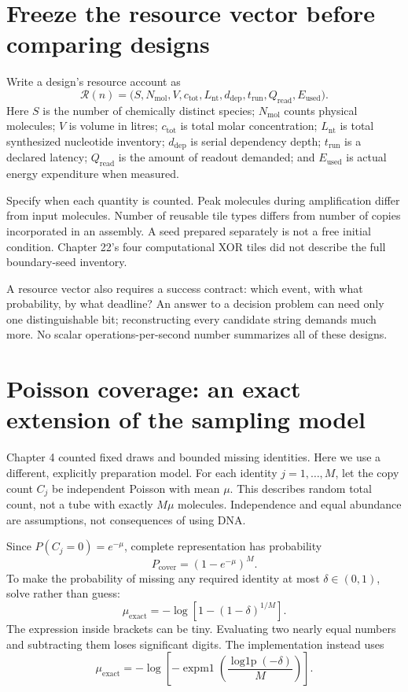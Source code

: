 \section{Freeze the resource vector before comparing designs}
Write a design's resource account as
\begin{equation}
\mathcal R(n)=
\bigl(S,N_{\mathrm{mol}},V,c_{\mathrm{tot}},L_{\mathrm{nt}},
d_{\mathrm{dep}},t_{\mathrm{run}},Q_{\mathrm{read}},E_{\mathrm{used}}\bigr).
\label{dnad24:vector}
\end{equation}
Here $S$ is the number of chemically distinct species; $N_{\mathrm{mol}}$ counts
physical molecules; $V$ is volume in litres; $c_{\mathrm{tot}}$ is total molar
concentration; $L_{\mathrm{nt}}$ is total synthesized nucleotide inventory;
$d_{\mathrm{dep}}$ is serial dependency depth; $t_{\mathrm{run}}$ is a declared
latency; $Q_{\mathrm{read}}$ is the amount of readout demanded; and
$E_{\mathrm{used}}$ is actual energy expenditure when measured.

Specify when each quantity is counted. Peak molecules during amplification differ
from input molecules. Number of reusable tile types differs from number of copies
incorporated in an assembly. A seed prepared separately is not a free initial
condition. Chapter 22's four computational XOR tiles did not describe the full
boundary-seed inventory.

A resource vector also requires a success contract: which event, with what
probability, by what deadline? An answer to a decision problem can need only one
distinguishable bit; reconstructing every candidate string demands much more.
No scalar operations-per-second number summarizes all of these designs.

\section{Poisson coverage: an exact extension of the sampling model}
Chapter 4 counted fixed draws and bounded missing identities. Here we use a
different, explicitly  preparation model. For each identity
$j=1,\ldots,M$, let the copy count $C_j$ be independent Poisson with mean $\mu$.
This describes random total count, not a tube with exactly $M\mu$ molecules.
Independence and equal abundance are assumptions, not consequences of using DNA.

Since $P(C_j=0)=e^{-\mu}$, complete representation has probability
\begin{equation}
P_{\mathrm{cover}}=(1-e^{-\mu})^M.
\label{dnad24:coverage}
\end{equation}
To make the probability of missing any required identity at most
$\delta\in(0,1)$, solve rather than guess:
\begin{equation}
\mu_{\mathrm{exact}}
=-\log\!\left[1-(1-\delta)^{1/M}\right].
\label{dnad24:mu}
\end{equation}
The expression inside brackets can be tiny. Evaluating two nearly equal numbers
and subtracting them loses significant digits. The implementation instead uses
\[
\mu_{\mathrm{exact}}
=-\log\!\left[-\operatorname{expm1}
  \left(\frac{\operatorname{log1p}(-\delta)}{M}\right)\right].
\]

